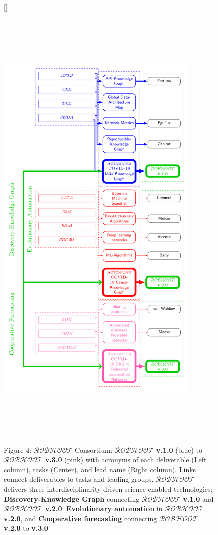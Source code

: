 \documentclass[11pt, a4paper]{article} %
\begin{document}
\begin{figure}[h!]
  [\FBwidth]
  {\caption*{Figure 4: $\mathcal{ROBHOOT}$ Consortium: {\bf
        $\mathcal{ROBHOOT}$ v.1.0} (blue) to {\bf $\mathcal{ROBHOOT}$
        v.3.0} (pink) with acronyms of each deliverable (Left column),
      tasks (Center), and lead name (Right column). Links connect
      deliverables to tasks and leading groups. $\mathcal{ROBHOOT}$
      delivers three interdisciplinarity-driven science-enabled
      technologies: {\bf Discovery-Knowledge Graph} connecting {\bf
        $\mathcal{ROBHOOT}$ v.1.0} and {\bf $\mathcal{ROBHOOT}$
        v.2.0}. {\bf Evolutionary automation} in {\bf
        $\mathcal{ROBHOOT}$ v.2.0}, and {\bf Cooperative forecasting}
      connecting {\bf $\mathcal{ROBHOOT}$ v.2.0} to {\bf
        v.3.0}}}
  {\includegraphics[width=9.75cm,height=22cm]{Figures/Consortium.pdf}}
\end{figure}
  
\end{document}
